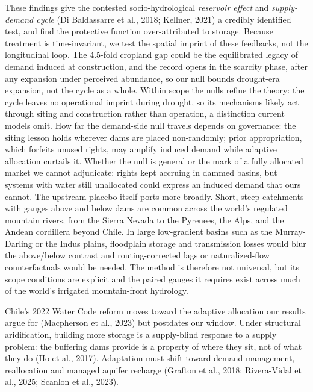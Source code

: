 \documentclass[
]{agujournal2019}
\begin{document}
These findings give the contested socio-hydrological \emph{reservoir
effect} and \emph{supply-demand cycle} (Di Baldassarre et al., 2018;
Kellner, 2021) a credibly identified test, and find the protective
function over-attributed to storage. Because treatment is
time-invariant, we test the spatial imprint of these feedbacks, not the
longitudinal loop. The 4.5-fold cropland gap could be the equilibrated
legacy of demand induced at construction, and the record opens in the
scarcity phase, after any expansion under perceived abundance, so our
null bounds drought-era expansion, not the cycle as a whole. Within
scope the nulls refine the theory: the cycle leaves no operational
imprint during drought, so its mechanisms likely act through siting and
construction rather than operation, a distinction current models omit.
How far the demand-side null travels depends on governance: the siting
lesson holds wherever dams are placed non-randomly; prior appropriation,
which forfeits unused rights, may amplify induced demand while adaptive
allocation curtails it. Whether the null is general or the mark of a
fully allocated market we cannot adjudicate: rights kept accruing in
dammed basins, but systems with water still unallocated could express an
induced demand that ours cannot. The upstream placebo itself ports more
broadly. Short, steep catchments with gauges above and below dams are
common across the world's regulated mountain rivers, from the Sierra
Nevada to the Pyrenees, the Alps, and the Andean cordillera beyond
Chile. In large low-gradient basins such as the Murray-Darling or the
Indus plains, floodplain storage and transmission losses would blur the
above/below contrast and routing-corrected lags or naturalized-flow
counterfactuals would be needed. The method is therefore not universal,
but its scope conditions are explicit and the paired gauges it requires
exist across much of the world's irrigated mountain-front hydrology.

Chile's 2022 Water Code reform moves toward the adaptive allocation our
results argue for (Macpherson et al., 2023) but postdates our window.
Under structural aridification, building more storage is a supply-blind
response to a supply problem: the buffering dams provide is a property
of where they sit, not of what they do (Ho et al., 2017). Adaptation
must shift toward demand management, reallocation and managed aquifer
recharge (Grafton et al., 2018; Rivera-Vidal et al., 2025; Scanlon et
al., 2023).
\end{document}
